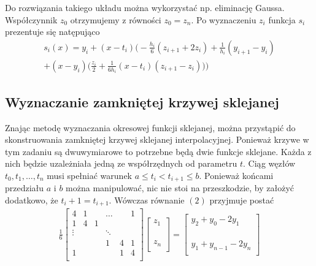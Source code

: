 \documentclass[11pt,wide]{article}
\begin{document}
Do rozwiązania takiego układu można wykorzystać np. eliminację Gaussa. Współczynnik $z_0$ otrzymujemy z równości $z_0 = z_n$. Po wyznaczeniu $z_i$ funkcja $s_i$ prezentuje się natępująco
\begin{equation}
\begin{split}
    s_i(x)= y_i + (x-t_i)\Big(-\frac{h_i}{6}(z_{i+1}+2z_i)+\frac{1}{h_i}(y_{i+1}-y_i)\\+(x-y_i)\big(\frac{z_i}{2}+\frac{1}{6h_i}(x-t_i)(z_{i+1}-z_i)\big)\Big)
\end{split}
\end{equation}


\subsection{Wyznaczanie zamkniętej krzywej sklejanej}
Znając metodę wyznaczania okresowej funkcji sklejanej, można przystąpić do skonstruowania zamkniętej krzywej sklejanej interpolacyjnej. Ponieważ krzywe w tym zadaniu są dwuwymiarowe to potrzebne będą dwie funkcje sklejane. Każda z nich będzie uzależniała jedną ze współrzędnych od parametru $t$. Ciąg węzłów $t_0, t_1, \dots, t_n$ musi spełniać warunek $a \leq t_i < t_{i+1} \leq b$. Ponieważ końcami przedziału $a$ i $b$ można manipulować, nic nie stoi na przeszkodzie, by założyć dodatkowo, że $t_i + 1 = t_{i+1}$. Wówczas równanie $(2)$ przyjmuje postać
\begin{equation}
\begin{split}
\frac{1}{6}
\begin{bmatrix}
    4 & 1 & &\dots& & 1\\
    1 & 4 & 1&&& \\
    \vdots& && \ddots && \\
    & &&1 &4 &1\\
    1& & &&1 & 4 \\
\end{bmatrix}
\begin{bmatrix}
z_1\\
\\
\\
\\
z_n\\
\end{bmatrix}
=
\begin{bmatrix}
y_2+y_0-2y_1\\
\\
\\
\\
y_1+y_{n-1}-2y_n\\
\end{bmatrix}
\end{split}
\end{equation}
\end{document}
